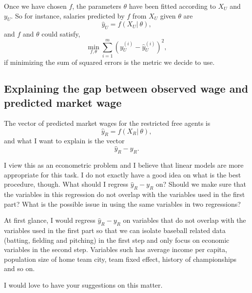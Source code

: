\documentclass[12pt,a4paper]{article}
\begin{document}
Once we have chosen $f$, the parameters $\theta$ have been fitted according to  $X_{U}$ and $y_{U}$.  So for instance, salaries predicted by $f$ from $X_U$ given $\theta$ are \[\hat{y}_U = f(X_U|\ \theta),\] and $f$ and $\theta$ could satisfy, 
\[\min_{f,\theta} \sum_{i=1}^{m} \left( y_U^{(i)} - \hat{y}_U^{(i)}\right)^2,\] if minimizing the sum of squared errors is the metric we decide to use.


\subsection{Explaining the gap between observed wage and predicted market wage}

The vector of predicted market wages for the restricted free agents is
\[\hat{y}_R = f(X_R|\ \theta),\] and what I want to explain is the vector
\[\hat{y}_R - y_R.\]

I view this as an econometric problem and I believe that linear models are more appropriate for this task. 
I do not exactly have a good idea on what is the best procedure, though. What should I regress $\hat{y}_R - y_R$ on? Should we make sure that the variables in this regression do not overlap with the variables used in the first part? What is the possible issue in using the same variables in two regressions? 

At first glance, I would regress $\hat{y}_R - y_R$ on variables that do not overlap with the variables used in the first part so that we can isolate baseball related data (batting, fielding and pitching) in the first step and only focus on economic variables in the second step. Variables such has average income per capita, population size of home team city, team fixed effect, history of championships and so on.

I would love to have your suggestions on this matter.
\end{document}
